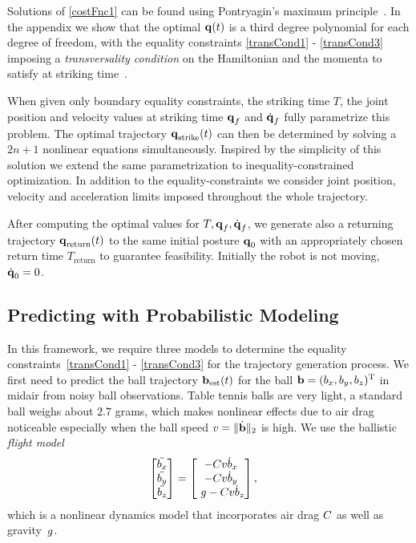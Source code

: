 Solutions of \eqref{costFnc1} can be found using Pontryagin's maximum principle~\cite{Pontryagin}. In the appendix we show that the optimal $\boldsymbol{\mathrm{q}}(t)$ is a third degree polynomial for each degree of freedom, with the equality constraints \eqref{transCond1} - \eqref{transCond3} imposing a \emph{transversality condition} on the Hamiltonian and the momenta to satisfy at striking time~\cite{Schaettler12}. %

When given only boundary equality constraints, the striking time $T$, the joint position and velocity values at striking time $\boldsymbol{\mathrm{q}}_f$ and $\dot{\boldsymbol{\mathrm{q}}}_f$ fully parametrize this problem. The optimal trajectory $\boldsymbol{\mathrm{q}}_{\mathrm{strike}}(t)$ can then be determined by solving a $2n+1$ nonlinear equations simultaneously. Inspired by the simplicity of this solution we extend the same parametrization to inequality-constrained optimization. In addition to the equality-constraints we consider joint position, velocity and acceleration limits imposed throughout the whole trajectory.

After computing the optimal values for $T, \boldsymbol{\mathrm{q}}_f, \dot{\boldsymbol{\mathrm{q}}}_f$, we generate also a returning trajectory $\boldsymbol{\mathrm{q}}_{\mathrm{return}}(t)$ to the same initial posture $\boldsymbol{\mathrm{q}}_0$ with an appropriately chosen return time $T_{\mathrm{return}}$ to guarantee feasibility. Initially the robot is not moving, $\dot{\boldsymbol{\mathrm{q}}}_0 = 0$.

\subsection{Predicting with Probabilistic Modeling}\label{sectionPredict}
 
In this framework, we require three models to determine the equality constraints~\eqref{transCond1} - \eqref{transCond3} for the trajectory generation process. We first need to predict the ball trajectory $\boldsymbol{\mathrm{b}}_{\mathrm{est}}(t)$ for the ball $\boldsymbol{\mathrm{b}} = (b_x,b_y,b_z)^{\mathrm{T}}$ in midair from noisy ball observations. Table tennis balls are very light, a standard ball weighs about $2.7$ grams, which makes nonlinear effects due to air drag noticeable especially when the ball speed $v = \|\dot{\boldsymbol{\mathrm{b}}}\|_2$ is high. We use the ballistic \emph{flight model} 
%
\begin{align}
\begin{bmatrix}
   \ddot{b_x} \\
   \ddot{b_y} \\
   \ddot{b_z}   
 \end{bmatrix} &= 
 \begin{bmatrix}
 -C v \dot{b}_x  \\
 -C v \dot{b}_y  \\
 \ g - C v \dot{b}_z 
 \end{bmatrix},
\label{flightModel}
\end{align}
%
\noindent which is a nonlinear dynamics model that incorporates air drag $C$ as well as gravity~$g$. %

